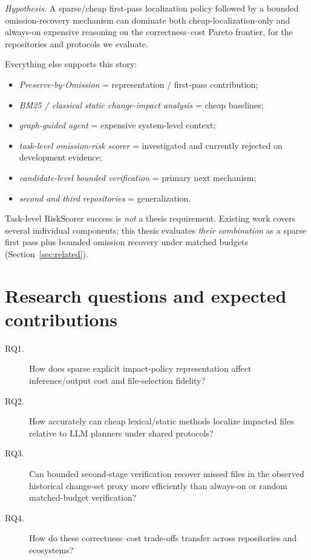 \documentclass[11pt,a4paper]{article}
\begin{document}
\emph{Hypothesis.} A sparse/cheap first-pass localization policy followed by a
bounded omission-recovery mechanism can dominate both cheap-localization-only
and always-on expensive reasoning on the correctness--cost Pareto frontier, for
the repositories and protocols we evaluate.

Everything else supports this story:
\begin{itemize}
  \item \emph{Preserve-by-Omission} = representation / first-pass contribution;
  \item \emph{BM25 / classical static change-impact analysis} = cheap baselines;
  \item \emph{graph-guided agent} = expensive system-level context;
  \item \emph{task-level omission-risk scorer} = investigated and currently
        rejected on development evidence;
  \item \emph{candidate-level bounded verification} = primary next mechanism;
  \item \emph{second and third repositories} = generalization.
\end{itemize}

Task-level RiskScorer success is \emph{not} a thesis requirement. Existing work
covers several individual components; this thesis evaluates \emph{their
combination} as a sparse first pass plus bounded omission recovery under
matched budgets (Section~\ref{sec:related}).

\section{Research questions and expected contributions}
\label{sec:rq}

\begin{description}
  \item[RQ1.] How does sparse explicit impact-policy representation affect
  inference/output cost and file-selection fidelity?
  \item[RQ2.] How accurately can cheap lexical/static methods localize impacted
  files relative to LLM planners under shared protocols?
  \item[RQ3.] Can bounded second-stage verification recover missed files in the
  observed historical change-set proxy more efficiently than always-on or
  random matched-budget verification?
  \item[RQ4.] How do these correctness--cost trade-offs transfer across
  repositories and ecosystems?
\end{description}
\end{document}
